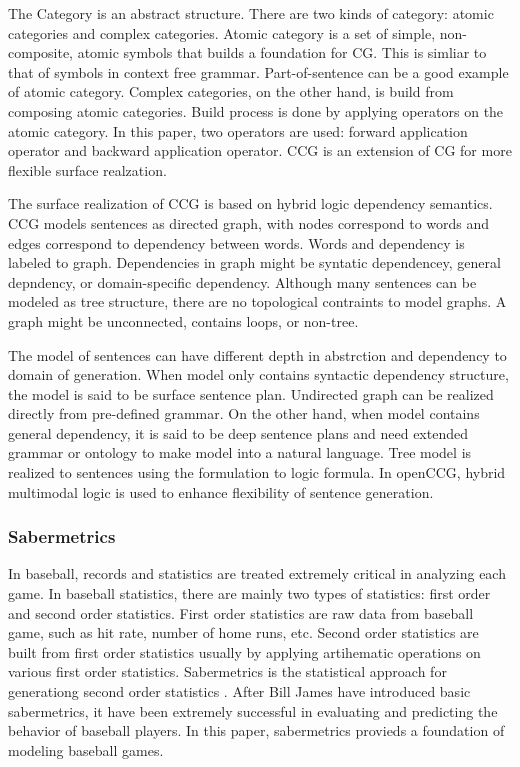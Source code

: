 \documentclass[11pt,letterpaper]{article}
\begin{document}
The Category is an abstract structure. There are two kinds of category: atomic categories and complex categories. Atomic category is a set of simple, non-composite, atomic symbols that builds a foundation for CG. This is simliar to that of symbols in context free grammar. Part-of-sentence can be a good example of atomic category. Complex categories, on the other hand, is build from composing atomic categories. Build process is done by applying operators on the atomic category. In this paper, two operators are used: forward application operator and backward application operator. CCG is an extension of CG for more flexible surface realzation. 

The surface realization of CCG is based on hybrid logic dependency semantics. CCG models sentences as directed graph, with nodes correspond to words and edges correspond to dependency between words. Words and dependency is labeled to graph. Dependencies in graph might be syntatic dependencey, general depndency, or domain-specific dependency. Although many sentences can be modeled as tree structure, there are no topological contraints to model graphs. A graph might be unconnected, contains loops, or non-tree. 

The model of sentences can have different depth in abstrction and dependency to domain of generation. When model only contains syntactic dependency structure, the model is said to be surface sentence plan. Undirected graph can be realized directly from pre-defined grammar. On the other hand, when model contains general dependency, it is said to be deep sentence plans and need extended grammar or ontology to make model into a natural language. Tree model is realized to sentences using the formulation to logic formula. In openCCG, hybrid multimodal logic is used to enhance flexibility of sentence generation. 


\subsubsection{Sabermetrics}

In baseball, records and statistics are treated extremely critical in analyzing each game. In baseball statistics, there are mainly two types of statistics: first order and second order statistics. First order statistics are raw data from baseball game, such as hit rate, number of home runs, etc. Second order statistics are built from first order statistics usually by applying artihematic operations on various first order statistics. Sabermetrics is the statistical approach for generationg second order statistics \cite{billjames}. After Bill James have introduced basic sabermetrics, it have been extremely successful in evaluating and predicting the behavior of baseball players. In this paper, sabermetrics provieds a foundation of modeling baseball games. 
\end{document}

